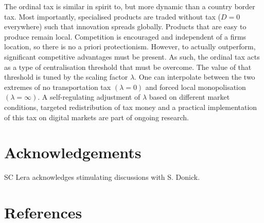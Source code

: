 \documentclass[final,5p,times,twocolumn,11pt,authoryear]{elsarticle}
\numberwithin{equation}{section} %
\begin{document}
The ordinal tax is similar in spirit to, but more dynamic than a country border tax. 
Most importantly, specialised products are traded without tax ($D=0$ everywhere) such that innovation spreads globally. 
Products that are easy to produce remain local. 
Competition is encouraged and independent of a firms location, so there is no a priori protectionism. 
However, to actually outperform, significant competitive advantages must be present. 
As such, the ordinal tax acts as a type of centralisation threshold that must be overcome. 
The value of that threshold is tuned by the scaling factor $\lambda$. 
One can interpolate between the two extremes of no transportation tax $(\lambda=0)$ and forced local monopolisation $(\lambda=\infty)$. 
A self-regulating adjustment of $\lambda$ based on different market conditions, targeted redistribution of tax money and a practical implementation of this tax on digital markets are part of ongoing research. 



\section*{Acknowledgements} 

SC Lera acknowledges stimulating discussions with S. Donick. 



\section*{References}


\end{document}
